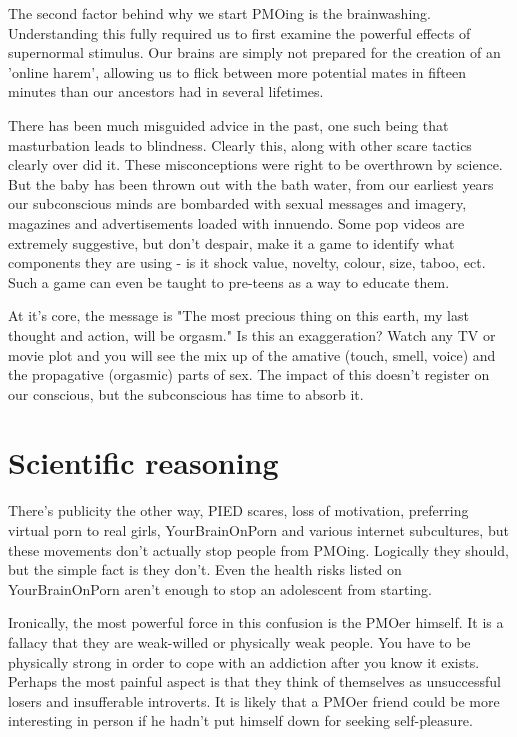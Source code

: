\documentclass[easypeasy.tex]{subfiles}
\begin{document}
The second factor behind why we start PMOing is the brainwashing. Understanding this fully required us to first examine the powerful effects of supernormal stimulus. Our brains are simply not prepared for the creation of an 'online harem', allowing us to flick between more potential mates in fifteen minutes than our ancestors had in several lifetimes.

There has been much misguided advice in the past, one such being that masturbation leads to blindness. Clearly this, along with other scare tactics clearly over did it. These misconceptions were right to be overthrown by science. But the baby has been thrown out with the bath water, from our earliest years our subconscious minds are bombarded with sexual messages and imagery, magazines and advertisements loaded with innuendo. Some pop videos are extremely suggestive, but don't despair, make it a game to identify what components they are using - is it shock value, novelty, colour, size, taboo, ect. Such a game can even be taught to pre-teens as a way to educate them.

At it's core, the message is "The most precious thing on this earth, my last thought and action, will be orgasm." Is this an exaggeration? Watch any TV or movie plot and you will see the mix up of the amative (touch, smell, voice) and the propagative (orgasmic) parts of sex. The impact of this doesn't register on our conscious, but the subconscious has time to absorb it.

\section{Scientific reasoning}
There's publicity the other way, PIED scares, loss of motivation, preferring virtual porn to real girls, YourBrainOnPorn and various internet subcultures, but these movements don't actually stop people from PMOing. Logically they should, but the simple fact is they don't. Even the health risks listed on YourBrainOnPorn aren't enough to stop an adolescent from starting.

Ironically, the most powerful force in this confusion is the PMOer himself. It is a fallacy that they are weak-willed or physically weak people. You have to be physically strong in order to cope with an addiction after you know it exists. Perhaps the most painful aspect is that they think of themselves as unsuccessful losers and insufferable introverts. It is likely that a PMOer friend could be more interesting in person if he hadn't put himself down for seeking self-pleasure.
\end{document}
